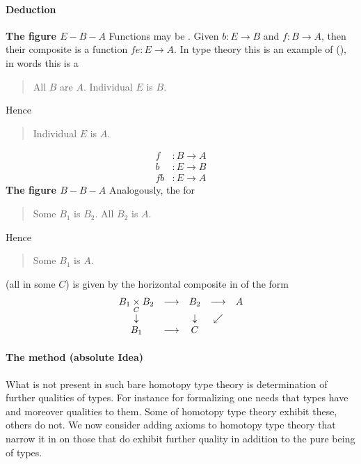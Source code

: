 \hypertarget{deduction}{}\paragraph*{{Deduction}}\label{deduction}
\textbf{The figure $E-B-A$}
Functions may be . Given $b \colon E \to B$ and $f \colon B \to A$, then their composite is a function $f e \colon E \to A$. In type theory this is an example of  (), in words this is a 
\begin{quote}%
All $B$ are $A$.
Individual $E$ is $B$.
\end{quote}
Hence
\begin{quote}%
Individual $E$ is $A$.
\end{quote}
\begin{displaymath}
\begin{aligned}
f & \colon B \longrightarrow A
\\
b & \colon E \longrightarrow B
\\
f b & \colon E \longrightarrow A
\end{aligned}
\end{displaymath}
\textbf{The figure $B-B-A$}
Analogously, the  for
\begin{quote}%
Some $B_1$ is $B_2$.
All $B_2$ is $A$.
\end{quote}
Hence
\begin{quote}%
Some $B_1$ is $A$.
\end{quote}
(all in some  $C$) is given by the horizontal composite in  of the form
\begin{displaymath}
\begin{matrix}
B_1 \underset{C}{\times} B_2 &\longrightarrow& B_2 &\longrightarrow& A
\\
\downarrow && \downarrow & \swarrow
\\
B_1 &\longrightarrow& C
\end{matrix}
\end{displaymath}
\hypertarget{the_method_absolute_idea}{}\paragraph*{{The method (absolute Idea)}}\label{the_method_absolute_idea}
What is not present in such bare homotopy type theory is determination of further qualities of types. For instance for  formalizing  one needs that types have  and moreover  qualities to them. Some  of homotopy type theory exhibit these, others do not. We now consider adding axioms to homotopy type theory that narrow it in on those  that do exhibit further quality in addition to the pure being of types.
